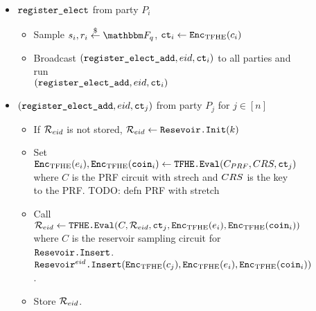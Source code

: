 \begin{figure}
{\begin{minipage}{1\textwidth}
\begin{itemize}
				\item $\texttt{register\_elect}$ from party $P_i$
				      \begin{itemize}
					      \item Sample $s_i, r_i \randomGet \F_q$, $\texttt{ct}_i \gets \texttt{Enc}_{\mathrm{TFHE}}(c_i)$
					      \item Broadcast $(\texttt{register\_elect\_add}, {eid}, \texttt{ct}_i)$ to all parties and run \\$(\texttt{register\_elect\_add}, {eid}, \texttt{ct}_i)$
				      \end{itemize}
				\item $(\texttt{register\_elect\_add}, {eid}, \texttt{ct}_j)$ from party $P_j$ for $j \in [n]$
				      \begin{itemize}
					      \item If $\mathcal{R}_{eid}$ is not stored, $\mathcal{R}_{eid} \gets \texttt{Resevoir.Init}(k)$
					      \item Set $\texttt{Enc}_{\mathrm{TFHE}}(e_i), \texttt{Enc}_{\mathrm{TFHE}}(\texttt{coin}_i) \gets \texttt{TFHE.Eval}(C_{PRF}, CRS, \texttt{ct}_j)$
					            where $C$ is the PRF circuit with strech and $CRS$ is the key to the PRF. TODO: defn PRF with stretch
					      \item Call $\mathcal{R}_{eid} \gets \texttt{TFHE.Eval}(C, \mathcal{R}_{eid}, \texttt{ct}_j, \texttt{Enc}_{\mathrm{TFHE}}(e_i), \texttt{Enc}_{\mathrm{TFHE}}(\texttt{coin}_i))$ where
					            $C$ is the reservoir sampling circuit for $\texttt{Resevoir.Insert}$. %
					            $\texttt{Resevoir}^{{eid}}\texttt{.Insert}(\texttt{Enc}_{\mathrm{TFHE}}(c_j), \texttt{Enc}_{\mathrm{TFHE}}(e_i), \texttt{Enc}_{\mathrm{TFHE}}(\texttt{coin}_i))$.
					      \item Store $\mathcal{R}_{eid}$.
				      \end{itemize}


\end{itemize}
\end{minipage}}
\end{figure}
